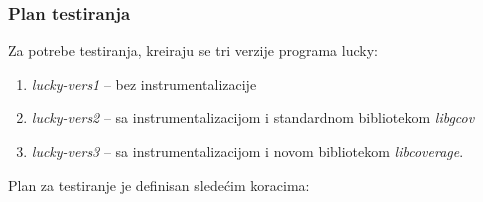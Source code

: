 \documentclass[12pt,oneside]{memoir}
\newcommand{\strano}[1]{\textit{#1}}
\begin{document}
\subsubsection{Plan testiranja}

Za potrebe testiranja, kreiraju se tri verzije programa lucky:
\begin{enumerate}
\item \strano{lucky-vers1} – bez instrumentalizacije
\item \strano{lucky-vers2} – sa instrumentalizacijom i standardnom bibliotekom \strano{libgcov}
\item \strano{lucky-vers3} – sa instrumentalizacijom i novom bibliotekom \strano{libcoverage}. 
\end{enumerate}

Plan za testiranje je definisan sledećim koracima:
\end{document}
